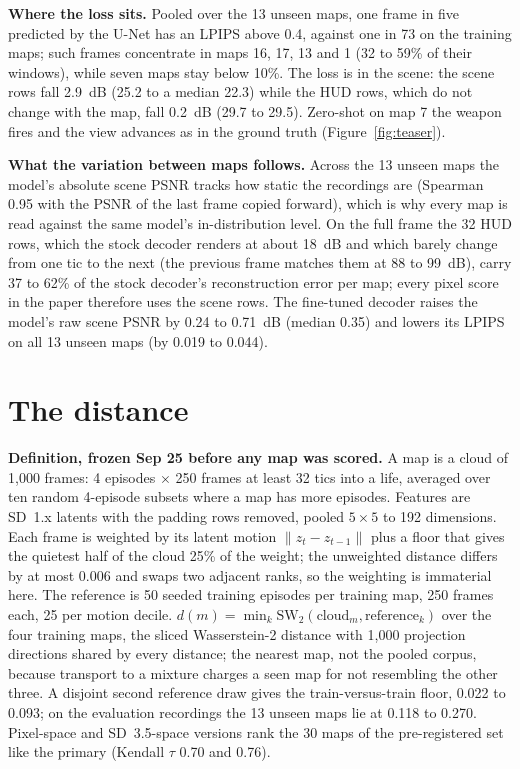 \textbf{Where the loss sits.} Pooled over the 13 unseen maps, one frame in five predicted by the U-Net has an LPIPS above 0.4, against one in 73 on the training maps; such frames concentrate in maps 16, 17, 13 and 1 (32 to 59\% of their windows), while seven maps stay below 10\%. The loss is in the scene: the scene rows fall 2.9~dB (25.2 to a median 22.3) while the HUD rows, which do not change with the map, fall 0.2~dB (29.7 to 29.5). Zero-shot on map 7 the weapon fires and the view advances as in the ground truth (Figure~\ref{fig:teaser}).

\textbf{What the variation between maps follows.} Across the 13 unseen maps the model's absolute scene PSNR tracks how static the recordings are (Spearman 0.95 with the PSNR of the last frame copied forward), which is why every map is read against the same model's in-distribution level. On the full frame the 32 HUD rows, which the stock decoder renders at about 18~dB and which barely change from one tic to the next (the previous frame matches them at 88 to 99~dB), carry 37 to 62\% of the stock decoder's reconstruction error per map; every pixel score in the paper therefore uses the scene rows. The fine-tuned decoder raises the model's raw scene PSNR by 0.24 to 0.71~dB (median 0.35) and lowers its LPIPS on all 13 unseen maps (by 0.019 to 0.044).

\section{The distance}
\label{app:distance}

\textbf{Definition, frozen Sep 25 before any map was scored.} A map is a cloud of 1,000 frames: 4 episodes $\times$ 250 frames at least 32 tics into a life, averaged over ten random 4-episode subsets where a map has more episodes. Features are SD~1.x latents with the padding rows removed, pooled $5\times5$ to 192 dimensions. Each frame is weighted by its latent motion $\lVert z_t-z_{t-1}\rVert$ plus a floor that gives the quietest half of the cloud 25\% of the weight; the unweighted distance differs by at most 0.006 and swaps two adjacent ranks, so the weighting is immaterial here. The reference is 50 seeded training episodes per training map, 250 frames each, 25 per motion decile. $d(m)=\min_k \mathrm{SW}_2(\text{cloud}_m,\text{reference}_k)$ over the four training maps, the sliced Wasserstein-2 distance with 1,000 projection directions shared by every distance; the nearest map, not the pooled corpus, because transport to a mixture charges a seen map for not resembling the other three. A disjoint second reference draw gives the train-versus-train floor, 0.022 to 0.093; on the evaluation recordings the 13 unseen maps lie at 0.118 to 0.270. Pixel-space and SD~3.5-space versions rank the 30 maps of the pre-registered set like the primary (Kendall $\tau$ 0.70 and 0.76).

